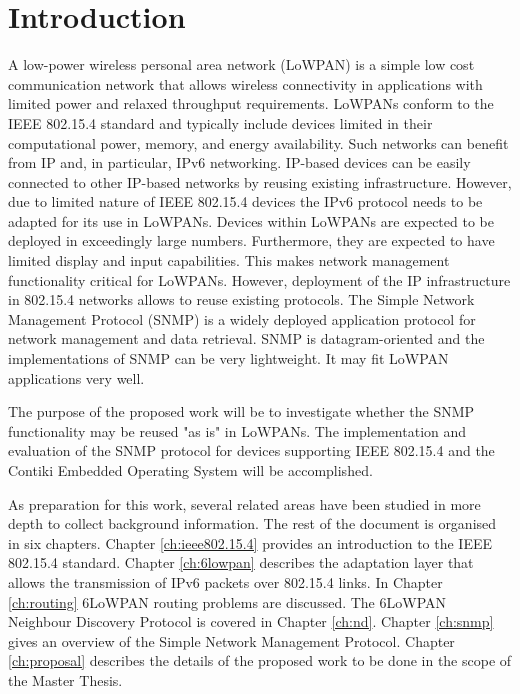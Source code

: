 \documentclass[12pt, titlepage, a4paper]{report}
\begin{document}
\chapter{Introduction}
A low-power wireless personal area network (LoWPAN) is a simple low cost communication network that allows wireless connectivity in applications with limited power and relaxed throughput requirements. LoWPANs conform to the IEEE 802.15.4 standard \cite{ieee802.15.4} and typically include devices limited in their computational power, memory, and energy availability. Such networks can benefit from IP and, in particular, IPv6 networking. IP-based devices can be easily connected to other IP-based networks by reusing existing infrastructure. However, due to limited nature of IEEE 802.15.4 devices the IPv6 protocol \cite{rfc2460} needs to be adapted for its use in LoWPANs.  Devices within LoWPANs are expected to be deployed in exceedingly large numbers. Furthermore, they are expected to have limited display and input capabilities. This makes network management functionality critical for LoWPANs. However, deployment of the IP infrastructure in 802.15.4 networks allows to reuse existing protocols. The Simple Network Management Protocol (SNMP) is a widely deployed application protocol for network management and data retrieval. SNMP is datagram-oriented and the implementations of SNMP can be very lightweight.  It may fit LoWPAN applications very well.

The purpose of the proposed work will be to investigate whether the SNMP functionality may be reused "as is" in LoWPANs. The implementation and evaluation of the SNMP protocol for devices supporting IEEE 802.15.4 and the Contiki Embedded Operating System \cite{contiki} will be accomplished. 

As preparation for this work, several related areas have been studied in more depth to collect background information. The rest of the document is organised in six chapters. Chapter \ref{ch:ieee802.15.4} provides an introduction to the IEEE 802.15.4 standard. Chapter \ref{ch:6lowpan} describes the adaptation layer that allows the transmission of IPv6 packets over 802.15.4 links. In Chapter \ref{ch:routing} 6LoWPAN routing problems are discussed. The 6LoWPAN Neighbour Discovery Protocol is covered in Chapter \ref{ch:nd}. Chapter \ref{ch:snmp} gives an overview of the Simple Network Management Protocol. Chapter \ref{ch:proposal} describes the details of the proposed work to be done in the scope of the Master Thesis.
\end{document}
